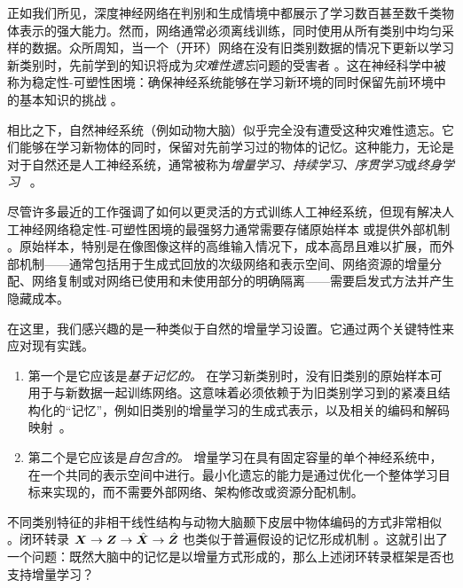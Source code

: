 \documentclass[../../book-main.tex]{subfiles}
\begin{document}
正如我们所见，深度神经网络在判别和生成情境中都展示了学习数百甚至数千类物体表示的强大能力。然而，网络通常必须离线训练，同时使用从所有类别中均匀采样的数据。众所周知，当一个（开环）网络在没有旧类别数据的情况下更新以学习新类别时，先前学到的知识将成为{\em 灾难性遗忘}问题的受害者 \cite{McCloskey1989catastrophic}。这在神经科学中被称为稳定性-可塑性困境：确保神经系统能够在学习新环境的同时保留先前环境中的基本知识的挑战 \cite{Grossberg1987CompetitiveLF}。

相比之下，自然神经系统（例如动物大脑）似乎完全没有遭受这种灾难性遗忘。它们能够在学习新物体的同时，保留对先前学习过的物体的记忆。这种能力，无论是对于自然还是人工神经系统，通常被称为{\em 增量学习、持续学习、序贯学习}或{\em 终身学习}~ \cite{controlled-forgetting}。



尽管许多最近的工作强调了如何以更灵活的方式训练人工神经系统，但现有解决人工神经网络稳定性-可塑性困境的最强努力通常需要存储原始样本 \cite{icarl,chaudhry2019tiny} 或提供外部机制 \cite{EWC}。原始样本，特别是在像图像这样的高维输入情况下，成本高昂且难以扩展，而外部机制——通常包括用于生成式回放的次级网络和表示空间、网络资源的增量分配、网络复制或对网络已使用和未使用部分的明确隔离——需要启发式方法并产生隐藏成本。


在这里，我们感兴趣的是一种类似于自然的增量学习设置。它通过两个关键特性来应对现有实践。
\begin{enumerate}
    \item 第一个是它应该是\emph{基于记忆的。} 在学习新类别时，没有旧类别的原始样本可用于与新数据一起训练网络。这意味着必须依赖于为旧类别学习到的紧凑且结构化的“记忆”，例如旧类别的增量学习的生成式表示，以及相关的编码和解码映射~\cite{fearnet}。
    \item 第二个是它应该是\emph{自包含的。} 增量学习在具有固定容量的单个神经系统中，在一个共同的表示空间中进行。最小化遗忘的能力是通过优化一个整体学习目标来实现的，而不需要外部网络、架构修改或资源分配机制。
\end{enumerate}

不同类别特征的非相干线性结构与动物大脑颞下皮层中物体编码的方式非常相似 \cite{Chang-Cell-2017,Bao2020AMO}。闭环转录 $\bm{X} \rightarrow \bm{Z} \rightarrow \hat{\bm{X}} \rightarrow \hat{\bm{Z}}$ 也类似于普遍假设的记忆形成机制 \cite{2020Vandeven,Josselyn2020MemoryER}。这就引出了一个问题：既然大脑中的记忆是以增量方式形成的，那么上述闭环转录框架是否也支持增量学习？
\end{document}
